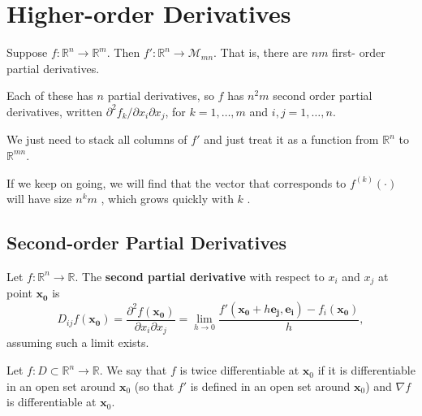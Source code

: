 \section{Higher-order Derivatives}

Suppose \(f: \mathbb{R}^{n} \rightarrow \mathbb{R}^{m}\). Then \(f' : \mathbb{R}^{n} \rightarrow \mathcal{M}_{mn}\). That is, there are \(nm\) first- order partial derivatives.

Each of these has \(n\) partial derivatives, so \(f\) has \(n^{2}m\) second order partial derivatives, written \(\partial^{2}f_{k} / \partial x_{i}\partial x_{j}\), for \(k = 1, \ldots , m\) and \(i, j = 1, \ldots , n\).

We just need to stack all columns of \(f'\) and just treat it as a function from \(\mathbb{R}^{n}\) to \(\mathbb{R}^{mn}\).

If we keep on going, we will find that the vector that corresponds to \(f^{(k)}(\cdot)\) will have size \(n^{k}m\) , which grows quickly with \(k\) .


\subsection{Second-order Partial Derivatives}

\begin{definition}
    Let $f: \mathbb{R}^{n} \to \mathbb{R}$. The \textbf{second partial derivative} with respect to $x_i$ and $x_j$ at point $\mathbf{x_0}$ is \[
        D_{ij}f(\mathbf{x_0}) = \frac{\partial ^{2}f(\mathbf{x_0})}{\partial x_i \partial x_j} = \lim_{h \to 0} \frac{f'(\mathbf{x_0}+h \mathbf{e_j}, \mathbf{e_i}) - f_i(\mathbf{x_0})}{h},
    \] assuming such a limit exists.
\end{definition}


\begin{definition}
    Let \(f: D \subset \mathbb{R}^{n} \rightarrow \mathbb{R}\). We say that \(f\) is twice differentiable at \(\mathbf{x}_{0}\) if it is differentiable in an open set around \(\mathbf{x}_{0}\) (so that \(f'\) is defined in an open set around \(\mathbf{x}_{0}\)) and \(\nabla f\) is differentiable at \(\mathbf{x}_{0}\).
\end{definition}

